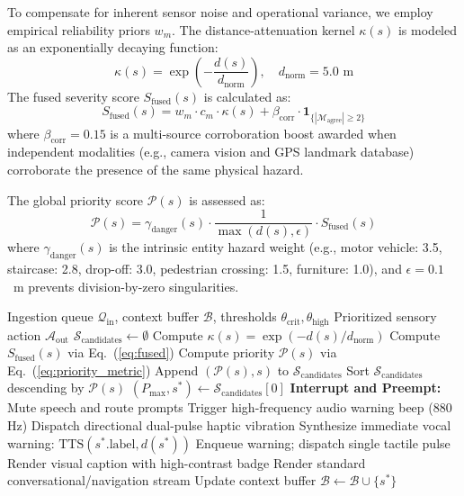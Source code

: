 \documentclass[conference]{IEEEtran}
\begin{document}
To compensate for inherent sensor noise and operational variance, we employ empirical reliability priors $w_m$. The distance-attenuation kernel $\kappa(s)$ is modeled as an exponentially decaying function:
\begin{equation}
\kappa(s) = \exp\left(-\frac{d(s)}{d_{\text{norm}}}\right), \quad d_{\text{norm}} = 5.0\text{ m}
\label{eq:decay}
\end{equation}
The fused severity score $S_{\text{fused}}(s)$ is calculated as:
\begin{equation}
S_{\text{fused}}(s) = w_m \cdot c_m \cdot \kappa(s) + \beta_{\text{corr}} \cdot \mathbf{1}_{\{|\mathcal{M}_{\text{agree}}| \ge 2\}}
\label{eq:fused}
\end{equation}
where $\beta_{\text{corr}} = 0.15$ is a multi-source corroboration boost awarded when independent modalities (e.g., camera vision and GPS landmark database) corroborate the presence of the same physical hazard.

The global priority score $\mathcal{P}(s)$ is assessed as:
\begin{equation}
\mathcal{P}(s) = \gamma_{\text{danger}}(s) \cdot \frac{1}{\max(d(s), \epsilon)} \cdot S_{\text{fused}}(s)
\label{eq:priority_metric}
\end{equation}
where $\gamma_{\text{danger}}(s)$ is the intrinsic entity hazard weight (e.g., motor vehicle: 3.5, staircase: 2.8, drop-off: 3.0, pedestrian crossing: 1.5, furniture: 1.0), and $\epsilon = 0.1$~m prevents division-by-zero singularities.

\begin{algorithm}[t]
\caption{Bayesian Priority Arbitration \& Preemption Pipeline}
\label{alg:priority}
\begin{algorithmic}[1]
\REQUIRE Ingestion queue $\mathcal{Q}_{\text{in}}$, context buffer $\mathcal{B}$, thresholds $\theta_{\text{crit}}, \theta_{\text{high}}$
\ENSURE Prioritized sensory action $\mathcal{A}_{\text{out}}$
\STATE $\mathcal{S}_{\text{candidates}} \leftarrow \emptyset$
    \STATE Compute $\kappa(s) = \exp(-d(s)/d_{\text{norm}})$
    \STATE Compute $S_{\text{fused}}(s)$ via Eq.~(\ref{eq:fused})
    \STATE Compute priority $\mathcal{P}(s)$ via Eq.~(\ref{eq:priority_metric})
    \STATE Append $(\mathcal{P}(s), s)$ to $\mathcal{S}_{\text{candidates}}$
\ENDFOR
\STATE Sort $\mathcal{S}_{\text{candidates}}$ descending by $\mathcal{P}(s)$
\STATE $(P_{\max}, s^*) \leftarrow \mathcal{S}_{\text{candidates}}[0]$
    \STATE \textbf{Interrupt and Preempt:} Mute speech and route prompts
    \STATE Trigger high-frequency audio warning beep (880 Hz)
    \STATE Dispatch directional dual-pulse haptic vibration
    \STATE Synthesize immediate vocal warning: $\text{TTS}(s^*.\text{label}, d(s^*))$
    \STATE Enqueue warning; dispatch single tactile pulse
    \STATE Render visual caption with high-contrast badge
\ELSE
    \STATE Render standard conversational/navigation stream
\ENDIF
\STATE Update context buffer $\mathcal{B} \leftarrow \mathcal{B} \cup \{s^*\}$
\end{algorithmic}
\end{algorithm}
\end{document}
